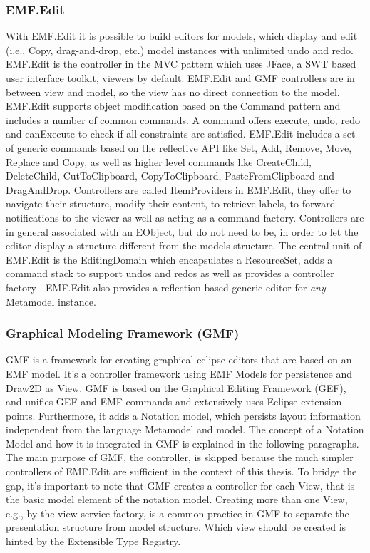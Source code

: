 \subsubsection{EMF.Edit}
With EMF.Edit it is possible to build editors for models, which display and edit (i.e., Copy, drag-and-drop, etc.) model instances with unlimited undo and redo. EMF.Edit is the controller in the MVC pattern which uses JFace, a SWT based user interface toolkit, viewers by default. EMF.Edit and GMF controllers are in between view and model, so the view has no direct connection to the model. EMF.Edit supports object modification based on the Command pattern \cite{patterns} and includes a number of common commands. A command offers execute, undo, redo and canExecute to check if all constraints are satisfied.  EMF.Edit includes a set of generic commands based on the reflective API like Set, Add, Remove, Move, Replace and Copy, as well as  higher level commands like CreateChild, DeleteChild, CutToClipboard, CopyToClipboard, PasteFromClipboard and DragAndDrop. Controllers are called ItemProviders in EMF.Edit, they offer to navigate their structure, modify their content, to retrieve labels, to forward notifications to the viewer as well as acting as a command factory. Controllers are in general associated with an EObject, but do not need to be, in order to let the editor display a structure different from the models structure. The central unit of EMF.Edit is the EditingDomain which encapsulates a ResourceSet, adds a command stack to support undos and redos as well as provides a controller factory \cite{EMF2nd}. EMF.Edit also provides a reflection based generic editor for \emph{any} Metamodel instance.  


\subsubsection {Graphical Modeling Framework (GMF)}
GMF is a framework for creating graphical eclipse editors that are based on an EMF model. It's a controller framework using EMF Models for persistence and Draw2D as View. GMF is based on the Graphical Editing Framework (GEF), and unifies GEF and EMF commands and extensively uses Eclipse extension points. Furthermore, it adds a Notation model, which persists layout information independent from the language Metamodel and model. The concept of a Notation Model and how it is integrated in GMF is explained in the following paragraphs. The main purpose of GMF, the controller, is skipped because the much simpler controllers of EMF.Edit are sufficient in the context of this thesis. To bridge the gap, it's important to note that GMF creates a controller for each View, that is the basic model element of the notation model. Creating more than one View, e.g., by the view service factory, is a common practice in GMF to separate the presentation structure from model structure. Which view should be created is hinted by the Extensible Type Registry.

